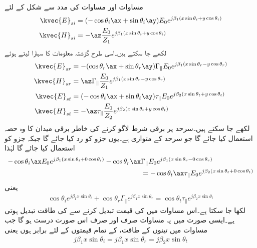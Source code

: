 مساوات  اور مساوات  کی مدد سے شکل  کے لئے
\begin{align}
\kvec{E}_{si}&=(-\cos \theta_i \ax+\sin \theta_i \ay)E_0  e^{j\beta_1 (x\sin \theta_i +y \cos \theta_i)}\\ 
\kvec{H}_{si}&=-\az \frac{E_0}{Z_1} e^{j\beta_1 (x\sin \theta_i +y \cos \theta_i)}
\end{align}
لکھے جا سکتے ہیں۔اسی طرح گزشتہ معلومات کا سہارا لیتے ہوئے
\begin{align}
\kvec{E}_{sr}&= -(\cos \theta_r \ax+\sin \theta_r \ay)\Gamma_{\parallel} E_0 e^{ j \beta_1 (x \sin \theta_r-y\cos \theta_r)}\\
\kvec{H}_{sr}&=\az\Gamma_{\parallel} \frac{ E_0}{Z_1} e^{j \beta_1 (x \sin \theta_r-y\cos \theta_r)}\\
\kvec{E}_{st} &= (-\cos \theta_t \ax+\sin \theta_t \ay )\tau_{\parallel} E_0 e^{j \beta_2 (x \sin \theta_t+y\cos \theta_t)}\\
\kvec{H}_{st} &=-\az \tau_{\parallel} \frac{E_0}{Z_2} e^{j \beta_2 (x \sin \theta_t+y\cos \theta_t)} 
\end{align}
لکھے جا سکتے ہیں۔سرحد  پر برقی شرط لاگو کرنے کی خاطر برقی میدان کا وہ حصہ استعمال کیا جائے گا جو سرحد کے متوازی ہے۔یوں  جزو کو رد کیا جائے گا جبکہ  جزو کو استعمال کیا جائے گا لہٰذا
\begin{align*}
-\cos \theta_i \ax E_0  e^{j\beta_1 (x\sin \theta_i +0 \cos \theta_i)}- \cos \theta_r \ax &\Gamma_{\parallel} E_0 e^{ j \beta_1 (x \sin \theta_r-0\cos \theta_r)}\\
&=-\cos \theta_t \ax\tau_{\parallel} E_0 e^{j \beta_2 (x \sin \theta_t+0\cos \theta_t)}
\end{align*}
یعنی
\begin{align}\label{مساوات_ترچھی_متوازی_قطبی_موج_برقی_شرط}
\cos \theta_i    e^{j\beta_1 x\sin \theta_i}+ \cos \theta_r \Gamma_{\parallel}  e^{ j \beta_1 x \sin \theta_r}=\cos \theta_t \tau_{\parallel}  e^{j \beta_2 x \sin \theta_t}
\end{align}
لکھا جا سکتا ہے۔اس مساوات میں  کی قیمت تبدیل کرنے سے  کی طاقت تبدیل ہوتی ہے۔ایسی صورت میں یہ مساوات صرف اور صرف اس صورت درست ہو گا جب مساوات میں تینوں  کے طاقت،  کے تمام قیمتوں کے لئے برابر ہوں یعنی
\begin{align}\label{مساوات_ترچھی_متوازی_قطبی_موج_برقی_شرط_پہلا_نتیجہ}
j \beta_1 x\sin \theta_i=j \beta_1 x \sin \theta_r=j \beta_2 x \sin \theta_t
\end{align} 
